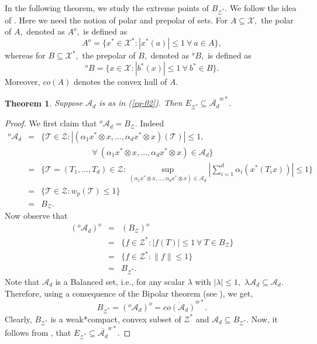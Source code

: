 \documentclass{amsart}
\newtheorem{theorem}{Theorem}[section]
\theoremstyle{definition}
\theoremstyle{remark}
\numberwithin{equation}{section}
\begin{document}
 
 In the following theorem, we study the extreme points of $B_{\mathcal{Z}^*}.$ We follow the idea of \cite[Th. 2.1]{M2}. Here we need the notion of polar and prepolar of sets. For $A\subseteq \mathcal{X},$ the polar of $A,$ denoted as $A^o,$ is defined as $$A^o=\{x^*\in \mathcal{X}^*:|x^*(a)|\leq 1 ~\forall~a\in A\},$$
  whereas for $B\subseteq \mathcal{X}^*,$ the prepolar of $B,$ denoted as ${}^oB,$ is defined as   \[{}^oB=\{x\in \mathcal{X}:|b^*(x)|\leq 1 ~\forall~b^*\in B\}.\] Moreover, $co(A)$ denotes the convex hull of $A.$
 \begin{theorem}\label{th-01}
 Suppose $\mathcal{A}_d$ is as in (\ref{eq-02}). Then $E_{\mathcal{Z}^*}\subseteq  {\overline{\mathcal{A}_d}}^{w*}.$
 \end{theorem}
 \begin{proof}
 	We first claim that ${}^o\mathcal{A}_d=B_{\mathcal{Z}}.$ Indeed
 	\begin{eqnarray*}
 		{}^o\mathcal{A}_d&=& \Big\{\mathcal{T}\in \mathcal{Z}:|(\alpha_1x^*\otimes x,\ldots,\alpha_dx^*\otimes x)(\mathcal{T})|\leq 1 ,\\
 		&&\quad\quad\quad \quad\quad\quad~\forall~ (\alpha_1x^*\otimes x,\ldots,\alpha_dx^*\otimes x)\in \mathcal{A}_d\Big\}\\
 		&=& \Big\{\mathcal{T}=(T_1,\ldots,T_d)\in \mathcal{Z}:\sup_{(\alpha_1x^*\otimes x,\ldots,\alpha_dx^*\otimes x)\in \mathcal{A}_d}|\sum_{i=1}^d\alpha_i(x^*(T_ix))|\leq 1 \Big\}\\
 		&=& \Big\{\mathcal{T}\in \mathcal{Z}:w_p(\mathcal{T})\leq 1 \Big\}\\
 		&=& B_{\mathcal{Z}}.
 	\end{eqnarray*}
 Now observe that
 \begin{eqnarray*}
 	({}^o\mathcal{A}_d)^o&=&(B_{\mathcal{Z}})^o\\
 	&=&\{f\in {\mathcal{Z}}^*:|f(T)|\leq 1~\forall~T\in B_{\mathcal{Z}}\}\\
 	&=&\{f\in {\mathcal{Z}}^*:\|f\|\leq 1\}\\
 	&=&B_{\mathcal{Z}^*}.
 \end{eqnarray*} 
Note that $\mathcal{A}_d$ is a Balanced set, i.e., for any scalar $\lambda$ with $|\lambda|\leq1,$ $\lambda \mathcal{A}_d\subseteq \mathcal{A}_d.$ Therefore, using a consequence of the Bipolar theorem (see \cite[Cor. 1.9, pp. 127]{CONW90}), we get,
\begin{equation*}\label{eq-bipolar}
	B_{\mathcal{Z}^*}=({}^o\mathcal{A}_d)^o=\overline{co(\mathcal{A}_d)}^{w*}.	
\end{equation*}
Clearly, $B_{\mathcal{Z}^*}$ is a weak*compact, convex subset of $\mathcal{Z}^*$ and $\mathcal{A}_d\subseteq B_{\mathcal{Z}^*}.$ Now, it follows from \cite[Th. 7.8, pp. 143]{CONW90}, that $E_{\mathcal{Z}^*}\subseteq {\overline{\mathcal{A}_d}}^{w*}.$
 	\end{proof}
 
\end{document}
